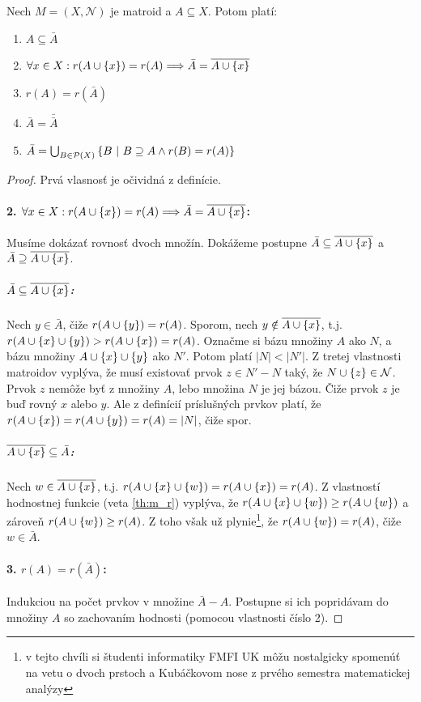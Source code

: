 \begin{theorem}
\label{th:closure}
Nech $M = (X, \mathcal{N})$ je matroid a $A \subseteq X$. Potom platí:
\begin{enumerate}
    \item $A \subseteq \bar{A}$
    \item $\forall x \in X: r(A \cup \left\{x\right\}) = r(A) \Longrightarrow \bar{A} = \overline{A \cup \left\{x\right\}}$
    \item $r(A) = r(\bar{A})$
    \item $\bar{A} = \bar{\bar{A}}$
    \item $\bar{A} = \bigcup_{B \in \mathcal{P}(X)} \left\{B ~|~ B \supseteq A \wedge r(B) = r(A)\right\}$
\end{enumerate}
\end{theorem}
\begin{proof}
Prvá vlasnosť je očividná z definície.
\paragraph{2. $\forall x \in X: r(A \cup \left\{x\right\}) = r(A) \Longrightarrow \bar{A} = \overline{A \cup \left\{x\right\}}$:}
Musíme dokázať rovnosť dvoch množín.
Dokážeme postupne $\bar{A} \subseteq \overline{A \cup \left\{x\right\}}$ a $\bar{A} \supseteq \overline{A \cup \left\{x\right\}}$.
\subparagraph{$\bar{A} \subseteq \overline{A \cup \left\{x\right\}}$:} 
Nech $y \in \bar{A}$, čiže $r(A \cup \left\{y\right\}) = r(A)$.
Sporom, nech $y \notin \overline{A \cup \left\{x\right\}}$, t.j. $r(A \cup \left\{x\right\} \cup \left\{y\right\}) > r(A \cup \left\{x\right\}) = r(A)$.
Označme si bázu množiny $A$ ako $N$, a bázu množiny $A \cup \left\{x\right\} \cup \left\{y\right\}$ ako $N'$.
Potom platí $|N| < |N'|$.
Z tretej vlastnosti matroidov vyplýva, že musí existovať prvok $z \in N' - N$ taký, že $N \cup \left\{z\right\} \in \mathcal{N}$.
Prvok $z$ nemôže byť z množiny $A$, lebo množina $N$ je jej bázou.
Čiže prvok $z$ je buď rovný $x$ alebo $y$.
Ale z definícií príslušných prvkov platí, že $r(A \cup \left\{x\right\}) = r(A \cup \left\{y\right\}) = r(A) = |N|$, čiže spor.
\subparagraph{$\overline{A \cup \left\{x\right\}}\subseteq \bar{A} $:} Nech $w \in \overline{A \cup \left\{x\right\}}$, t.j. $r(A \cup \left\{x\right\} \cup \left\{w\right\}) = r(A \cup \left\{x\right\}) = r(A)$.
Z vlastností hodnostnej funkcie (veta \ref{th:m_r}) vyplýva, že $r(A \cup \left\{x\right\} \cup \left\{w\right\}) \geq r(A \cup\left\{w\right\})$ a zároveň $r(A \cup\left\{w\right\}) \geq r(A)$.
Z toho však už plynie\footnote{v tejto chvíli si študenti informatiky FMFI UK môžu nostalgicky spomenúť na vetu o dvoch prstoch a Kubáčkovom nose z prvého semestra matematickej analýzy}, že $r(A \cup \left\{w\right\}) = r(A)$, čiže $w \in \bar{A}$.
\paragraph{3. $r(A) = r(\bar{A})$:} Indukciou na počet prvkov v množine  $\bar{A} - A$.
Postupne si ich popridávam do množiny $A$ so zachovaním hodnosti (pomocou vlastnosti číslo 2).

\end{proof}
